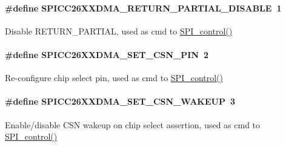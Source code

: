 \paragraph[{S\-P\-I\-C\-C26\-X\-X\-D\-M\-A\-\_\-\-R\-E\-T\-U\-R\-N\-\_\-\-P\-A\-R\-T\-I\-A\-L\-\_\-\-D\-I\-S\-A\-B\-L\-E}]{\setlength{\rightskip}{0pt plus 5cm}\#define S\-P\-I\-C\-C26\-X\-X\-D\-M\-A\-\_\-\-R\-E\-T\-U\-R\-N\-\_\-\-P\-A\-R\-T\-I\-A\-L\-\_\-\-D\-I\-S\-A\-B\-L\-E~1}\label{_s_p_i_c_c26_x_x_d_m_a_8h_a6454ac0d2222d98114cf15a4a60367ca}
Disable R\-E\-T\-U\-R\-N\-\_\-\-P\-A\-R\-T\-I\-A\-L, used as cmd to \hyperlink{_s_p_i_8h_ab9d3a23991be2741f382749d3844cc2f}{S\-P\-I\-\_\-control()} 
\paragraph[{S\-P\-I\-C\-C26\-X\-X\-D\-M\-A\-\_\-\-S\-E\-T\-\_\-\-C\-S\-N\-\_\-\-P\-I\-N}]{\setlength{\rightskip}{0pt plus 5cm}\#define S\-P\-I\-C\-C26\-X\-X\-D\-M\-A\-\_\-\-S\-E\-T\-\_\-\-C\-S\-N\-\_\-\-P\-I\-N~2}\label{_s_p_i_c_c26_x_x_d_m_a_8h_a447172f0061a6de65a8f0d221a23f93c}
Re-\/configure chip select pin, used as cmd to \hyperlink{_s_p_i_8h_ab9d3a23991be2741f382749d3844cc2f}{S\-P\-I\-\_\-control()} 
\paragraph[{S\-P\-I\-C\-C26\-X\-X\-D\-M\-A\-\_\-\-S\-E\-T\-\_\-\-C\-S\-N\-\_\-\-W\-A\-K\-E\-U\-P}]{\setlength{\rightskip}{0pt plus 5cm}\#define S\-P\-I\-C\-C26\-X\-X\-D\-M\-A\-\_\-\-S\-E\-T\-\_\-\-C\-S\-N\-\_\-\-W\-A\-K\-E\-U\-P~3}\label{_s_p_i_c_c26_x_x_d_m_a_8h_a55b298e59379bdd6020f8d55bb4264a9}
Enable/disable C\-S\-N wakeup on chip select assertion, used as cmd to \hyperlink{_s_p_i_8h_ab9d3a23991be2741f382749d3844cc2f}{S\-P\-I\-\_\-control()} 

